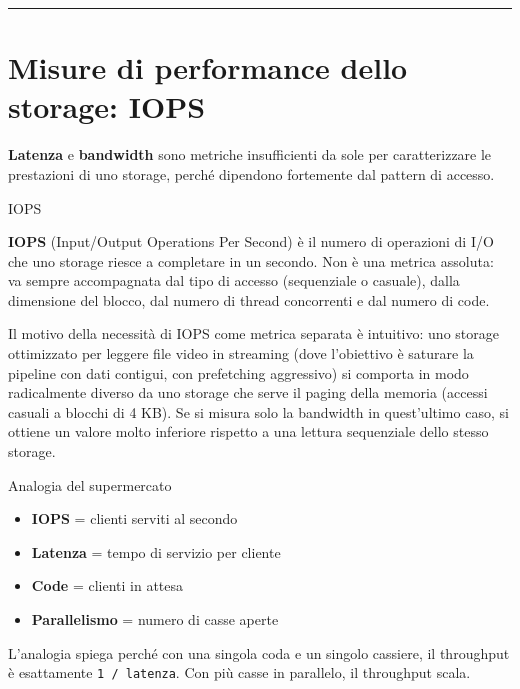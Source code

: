 \documentclass[
  italian,
  openany]{book}
\providecommand{\tightlist}{%
  \setlength{\itemsep}{0pt}\setlength{\parskip}{0pt}}
\begin{document}
\begin{center}\rule{0.5\linewidth}{0.5pt}\end{center}

\section{Misure di performance dello storage:
IOPS}\label{misure-di-performance-dello-storage-iops}

\textbf{Latenza} e \textbf{bandwidth} sono metriche insufficienti da
sole per caratterizzare le prestazioni di uno storage, perché dipendono
fortemente dal pattern di accesso.

\begin{calloutdefinition}{IOPS}

\textbf{IOPS} (Input/Output Operations Per Second) è il numero di
operazioni di I/O che uno storage riesce a completare in un secondo. Non
è una metrica assoluta: va sempre accompagnata dal tipo di accesso
(sequenziale o casuale), dalla dimensione del blocco, dal numero di
thread concorrenti e dal numero di code.

\end{calloutdefinition}

Il motivo della necessità di IOPS come metrica separata è intuitivo: uno
storage ottimizzato per leggere file video in streaming (dove
l'obiettivo è saturare la pipeline con dati contigui, con prefetching
aggressivo) si comporta in modo radicalmente diverso da uno storage che
serve il paging della memoria (accessi casuali a blocchi di 4 KB). Se si
misura solo la bandwidth in quest'ultimo caso, si ottiene un valore
molto inferiore rispetto a una lettura sequenziale dello stesso storage.

\begin{callouttip}{Analogia del supermercato}

\begin{itemize}
\tightlist
\item
  \textbf{IOPS} = clienti serviti al secondo
\item
  \textbf{Latenza} = tempo di servizio per cliente
\item
  \textbf{Code} = clienti in attesa
\item
  \textbf{Parallelismo} = numero di casse aperte
\end{itemize}

L'analogia spiega perché con una singola coda e un singolo cassiere, il
throughput è esattamente \texttt{1\ /\ latenza}. Con più casse in
parallelo, il throughput scala.

\end{callouttip}
\end{document}

